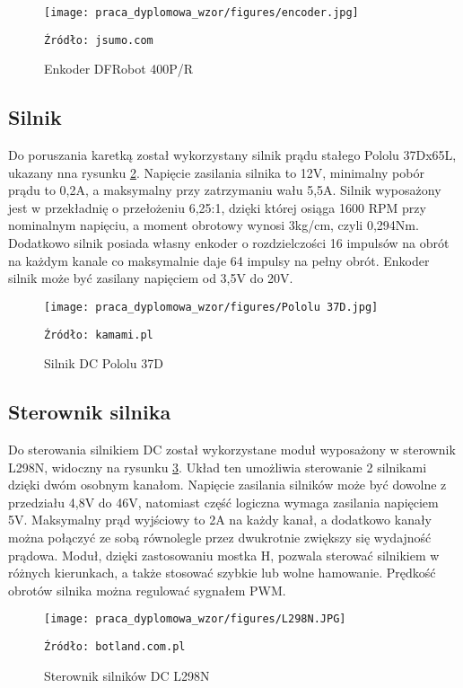 \begin{figure}
    \centering
    \texttt{[image: praca\_dyplomowa\_wzor/figures/encoder.jpg]}
    \caption{Enkoder DFRobot 400P/R}
    \texttt{Źródło: jsumo.com}
    \label{fig:Enkoder}
\end{figure}

\subsection{Silnik}
Do poruszania karetką został wykorzystany silnik prądu stałego Pololu 37Dx65L, ukazany nna rysunku \ref{fig:Silnik}. Napięcie zasilania silnika to 12V, minimalny pobór prądu to 0,2A, a maksymalny przy zatrzymaniu wału 5,5A. Silnik wyposażony jest w przekładnię o przełożeniu 6,25:1, dzięki której osiąga 1600 RPM przy nominalnym napięciu, a moment obrotowy wynosi 3kg/cm, czyli 0,294Nm. Dodatkowo silnik posiada własny enkoder o rozdzielczości 16 impulsów na obrót na każdym kanale co maksymalnie daje 64 impulsy na pełny obrót. Enkoder silnik może być zasilany napięciem od 3,5V do 20V. 

\begin{figure}
    \centering
    \texttt{[image: praca\_dyplomowa\_wzor/figures/Pololu 37D.jpg]}
    \caption{Silnik DC Pololu 37D}
    \texttt{Źródło: kamami.pl}
    \label{fig:Silnik}
\end{figure}

\subsection{Sterownik silnika}
Do sterowania silnikiem DC został wykorzystane moduł wyposażony w sterownik L298N, widoczny na rysunku \ref{fig:L298N}. Układ ten umożliwia sterowanie 2 silnikami dzięki dwóm osobnym kanałom. Napięcie zasilania silników może być dowolne z przedziału 4,8V do 46V, natomiast część logiczna wymaga zasilania napięciem 5V. Maksymalny prąd wyjściowy to 2A na każdy kanał, a dodatkowo kanały można połączyć ze sobą równolegle przez dwukrotnie zwiększy się wydajność prądowa. Moduł, dzięki zastosowaniu mostka H, pozwala sterować silnikiem w różnych kierunkach, a także stosować szybkie lub wolne hamowanie. Prędkość obrotów silnika można regulować sygnałem PWM.

\begin{figure}
    \centering
    \texttt{[image: praca\_dyplomowa\_wzor/figures/L298N.JPG]}
    \caption{Sterownik silników DC L298N}
    \texttt{Źródło: botland.com.pl}
    \label{fig:L298N}
\end{figure}

